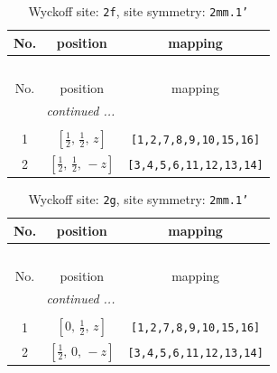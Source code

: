 \documentclass[fleqn,8pt]{jsarticle}
\begin{document}
\renewcommand{\arraystretch}{1.2}
\begin{longtable}{ccc}
\caption{Wyckoff site: {\tt 2f}, site symmetry: {\tt 2mm.1'}}
 \\
 \hline \hline
No. & position & mapping \\ \hline \endfirsthead

\multicolumn{2}{l}{\tablename\ \thetable{}} \\
 \hline \hline
No. & position & mapping \\ \hline \endhead

 \hline \hline
\multicolumn{2}{r}{\footnotesize\it continued ...} \\ \endfoot

 \hline \hline
\multicolumn{2}{r}{} \\ \endlastfoot

1 & $\left[ \frac{1}{2},\, \frac{1}{2},\, z \right]$ & {\tt [1,2,7,8,9,10,15,16]} \\ \hline
2 & $\left[ \frac{1}{2},\, \frac{1}{2},\, - z \right]$ & {\tt [3,4,5,6,11,12,13,14]} \\
\end{longtable}
\renewcommand{\arraystretch}{1.2}
\begin{longtable}{ccc}
\caption{Wyckoff site: {\tt 2g}, site symmetry: {\tt 2mm.1'}}
 \\
 \hline \hline
No. & position & mapping \\ \hline \endfirsthead

\multicolumn{2}{l}{\tablename\ \thetable{}} \\
 \hline \hline
No. & position & mapping \\ \hline \endhead

 \hline \hline
\multicolumn{2}{r}{\footnotesize\it continued ...} \\ \endfoot

 \hline \hline
\multicolumn{2}{r}{} \\ \endlastfoot

1 & $\left[ 0,\, \frac{1}{2},\, z \right]$ & {\tt [1,2,7,8,9,10,15,16]} \\ \hline
2 & $\left[ \frac{1}{2},\, 0,\, - z \right]$ & {\tt [3,4,5,6,11,12,13,14]} \\
\end{longtable}
\renewcommand{\arraystretch}{1.2}
\end{document}
